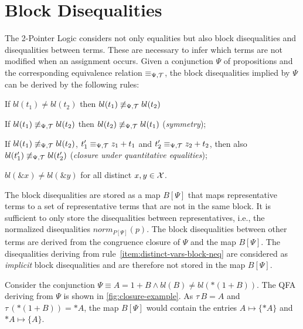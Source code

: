 \section{Block Disequalities}\label{section:block-disequalities}

The 2-Pointer Logic considers not only equalities but also block disequalities and disequalities between terms.
These are necessary to infer which terms are not
modified when an assignment occurs.
Given a conjunction $\Psi$ of propositions and the corresponding equivalence relation $\equiv_{\Psi,\mathcal{T}}$, the block disequalities implied by $\Psi$ can be derived by the following rules:

\begin{enumerate}[label={[B\arabic*]}, ref={[B\arabic*]}]
    \setcounter{enumi}{-1} %
    \item If $bl(t_1)\neq bl(t_2)$ then $bl(t_1)\not\equiv_{\Psi,\mathcal{T}} bl(t_2)$
    \item If $bl(t_1)\not\equiv_{\Psi,\mathcal{T}} bl(t_2)$ then $bl(t_2)\not\equiv_{\Psi,\mathcal{T}} bl(t_1)$
          (\emph{symmetry});
          \item\label{item:closure-under-quantitative-equalities}
          If $bl(t_1)\not\equiv_{\Psi,\mathcal{T}} bl(t_2)$, $t'_1 \equiv_{\Psi,\mathcal{T}} z_1+t_1$ and $t'_2\equiv_{\Psi,\mathcal{T}} z_2+t_2$, then
          also $bl(t'_1)\not\equiv_{\Psi,\mathcal{T}} bl(t'_2)$ (\emph{closure under quantitative equalities});
          \item\label{item:distinct-vars-block-neq} $bl(\&x) \neq bl(\&y)$ for all distinct $x, y \in \mathcal{X}$.
\end{enumerate}

The block disequalities are stored as a map $B[\Psi]$ that maps representative terms to a set of representative terms that are not in the same block.
It is sufficient to only store the disequalities between representatives, i.e.,
the normalized disequalities $norm_{P[\Psi]}(p)$.
The block disequalities between other terms are derived from the congruence closure of $\Psi$ and the map $B[\Psi]$.
The disequalities deriving from rule~\ref{item:distinct-vars-block-neq} are considered as \emph{implicit} block disequalities and are therefore not stored in the map $B[\Psi]$.

\begin{example}
    Consider the conjunction $\Psi \equiv A = 1 + B \land bl(B) \neq bl(*(1 + B))$.
    The QFA deriving from $\Psi$ is shown in \cref{fig:closure-example}.
    As $\tau\,B = A$ and $\tau\,(*(1+B)) = *A$, the map $B[\Psi]$ would contain the entries $A \mapsto \{*A\}$ and $*A \mapsto \{A\}$.
\end{example}

